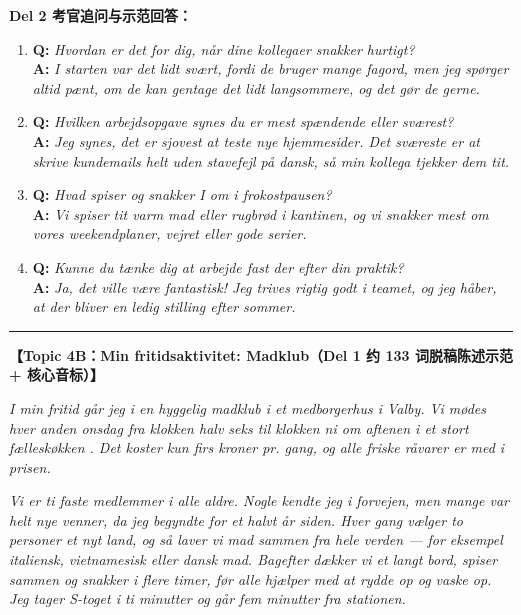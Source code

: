 \begin{answerbox}
\vspace{0.25em}
\textbf{\color{NCDRed}Del 2 考官追问与示范回答：}
\begin{enumerate}
  \item \textbf{Q:} \textit{Hvordan er det for dig, når dine kollegaer snakker hurtigt?}\\
  \textbf{A:} \textit{I starten var det lidt svært, fordi de bruger mange fagord, men jeg spørger altid pænt, om de kan gentage det lidt langsommere, og det gør de gerne.}
  \item \textbf{Q:} \textit{Hvilken arbejdsopgave synes du er mest spændende eller sværest?}\\
  \textbf{A:} \textit{Jeg synes, det er sjovest at teste nye hjemmesider. Det sværeste er at skrive kundemails helt uden stavefejl på dansk, så min kollega tjekker dem tit.}
  \item \textbf{Q:} \textit{Hvad spiser og snakker I om i frokostpausen?}\\
  \textbf{A:} \textit{Vi spiser tit varm mad eller rugbrød i kantinen, og vi snakker mest om vores weekendplaner, vejret eller gode serier.}
  \item \textbf{Q:} \textit{Kunne du tænke dig at arbejde fast der efter din praktik?}\\
  \textbf{A:} \textit{Ja, det ville være fantastisk! Jeg trives rigtig godt i teamet, og jeg håber, at der bliver en ledig stilling efter sommer.}
\end{enumerate}

\vspace{0.35em}
\hrule
\vspace{0.35em}

\textbf{\color{NCDNavy}【Topic 4B：Min fritidsaktivitet: Madklub（Del 1 约 133 词脱稿陈述示范 + 核心音标）】}

\vspace{0.18em}
\textit{I min fritid går jeg i en hyggelig madklub  i et medborgerhus  i Valby. Vi mødes hver anden onsdag fra klokken halv seks til klokken ni om aftenen i et stort fælleskøkken . Det koster kun firs kroner pr. gang, og alle friske råvarer  er med i prisen.}

\vspace{0.18em}
\textit{Vi er ti faste medlemmer i alle aldre. Nogle kendte jeg i forvejen, men mange var helt nye venner, da jeg begyndte for et halvt år siden. Hver gang vælger to personer et nyt land, og så laver vi mad sammen fra hele verden --- for eksempel italiensk, vietnamesisk eller dansk mad. Bagefter dækker vi et langt bord, spiser sammen og snakker i flere timer, før alle hjælper med at rydde op og vaske op. Jeg tager S-toget i ti minutter og går fem minutter fra stationen.}


\end{answerbox}
